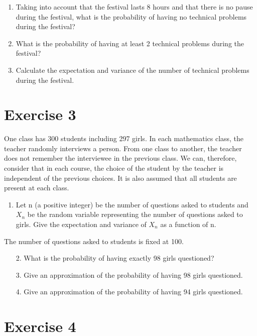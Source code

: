 \documentclass[12pt,thmsa]{article}\usepackage[]{graphicx}\usepackage[]{color}
\begin{document}
\begin{enumerate}
\item Taking into account that the festival lasts 8 hours and that there is no pause during
the festival, what is the probability of having no technical problems during the
festival?
\item What is the probability of having at least 2 technical problems during the festival?
\item Calculate the expectation and variance of the number of technical problems during the
festival.
\end{enumerate}



\section*{Exercise 3}

One class has 300 students including 297 girls. In each mathematics class, the
teacher randomly interviews a person. From one class to another, the teacher does not remember the interviewee in the previous class. We can, therefore, consider that in each course, the choice of the student by the teacher is independent of the previous choices. It is also assumed that all students are present at each class.

\begin{enumerate}
\item Let n (a positive integer) be the number of questions asked to students and $X_n$ be the random variable representing the number of questions asked to girls. Give the expectation and variance of $X_n$ as a function of n.
\end{enumerate}
\medskip

The number of questions asked to students is fixed at 100.

\begin{enumerate}
\item[2.] What is the probability of having exactly 98 girls questioned?
\item[3.] Give an approximation of the probability of having 98 girls questioned.
\item[4.] Give an approximation of the probability of having 94 girls questioned.
\end{enumerate}



\section*{Exercise 4}
\end{document}
